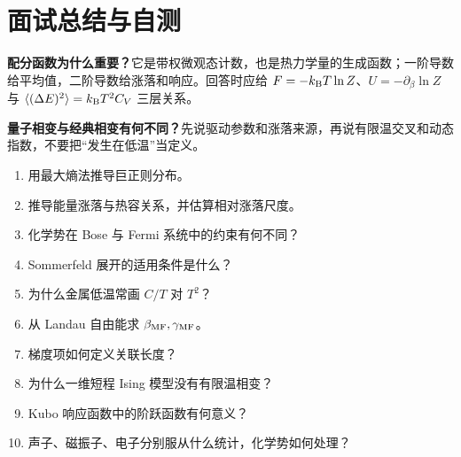 \section{面试总结与自测}
\begin{interviewbox}
\textbf{配分函数为什么重要？}它是带权微观态计数，也是热力学量的生成函数；一阶导数给平均值，二阶导数给涨落和响应。回答时应给
$F=-k_{\mathrm B} T\ln Z$、$U=-\partial_\beta\ln Z$ 与
$\langle(\Delta E)^2\rangle=k_{\mathrm B} T^2C_V$ 三层关系。

\textbf{量子相变与经典相变有何不同？}先说驱动参数和涨落来源，再说有限温交叉和动态指数，不要把“发生在低温”当定义。
\end{interviewbox}
\begin{selftestbox}
\begin{enumerate}
\item 用最大熵法推导巨正则分布。
\item 推导能量涨落与热容关系，并估算相对涨落尺度。
\item 化学势在 Bose 与 Fermi 系统中的约束有何不同？
\item Sommerfeld 展开的适用条件是什么？
\item 为什么金属低温常画 $C/T$ 对 $T^2$？
\item 从 Landau 自由能求 $\beta_{\rm MF},\gamma_{\rm MF}$。
\item 梯度项如何定义关联长度？
\item 为什么一维短程 Ising 模型没有有限温相变？
\item Kubo 响应函数中的阶跃函数有何意义？
\item 声子、磁振子、电子分别服从什么统计，化学势如何处理？
\end{enumerate}
\end{selftestbox}
